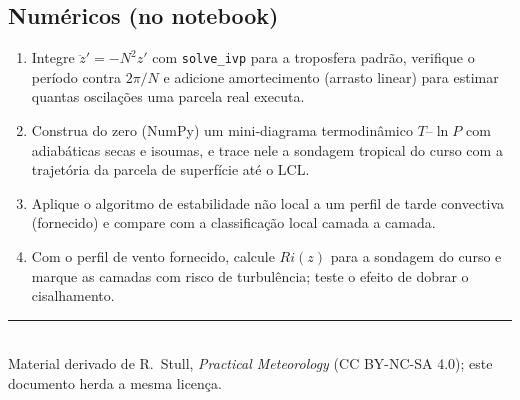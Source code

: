 \documentclass[11pt]{article}
\begin{document}
\subsection*{Numéricos (no notebook)}

\begin{enumerate}[label=\textbf{N\arabic*.},itemsep=4pt]
  \item Integre $\ddot z' = -N^2 z'$ com \texttt{solve\_ivp} para a
        troposfera padrão, verifique o período contra $2\pi/N$ e adicione
        amortecimento (arrasto linear) para estimar quantas oscilações
        uma parcela real executa.
  \item Construa do zero (NumPy) um mini-diagrama termodinâmico
        $T$--$\ln P$ com adiabáticas secas e isoumas, e trace nele a
        sondagem tropical do curso com a trajetória da parcela de
        superfície até o LCL.
  \item Aplique o algoritmo de estabilidade não local a um perfil de
        tarde convectiva (fornecido) e compare com a classificação local
        camada a camada.
  \item Com o perfil de vento fornecido, calcule $Ri(z)$ para a sondagem
        do curso e marque as camadas com risco de turbulência; teste o
        efeito de dobrar o cisalhamento.
\end{enumerate}

\vspace{1em}
\noindent\rule{\linewidth}{0.4pt}\\
{\scriptsize Material derivado de R.~Stull, \emph{Practical Meteorology}
(CC BY-NC-SA 4.0); este documento herda a mesma licença.}
\end{document}
